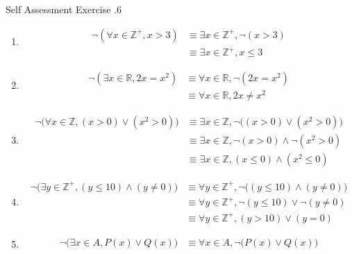 \documentclass[../notes.tex]{subfiles}
\begin{document}
			\begin{exercise}{Self Assessment Exercise \thechapter.6}
				\begin{enumerate}[label=(\alph*)]
					\item {}
						\begin{align*}
							\lnot (\forall x \in \mathbb{Z}^{+}, x > 3) &\equiv \exists x \in \mathbb{Z}^{+}, \lnot (x > 3)\\
							& \equiv \exists x \in \mathbb{Z}^{+}, x \leq 3
						\end{align*}
					\item {}
						\begin{align*}
							\lnot (\exists x \in \mathbb{R}, 2x = x^{2}) & \equiv \forall x \in \mathbb{R}, \lnot(2x = x^{2})\\
							& \equiv \forall x \in \mathbb{R}, 2x \neq x^{2}
						\end{align*}
					\item {}
						\begin{align*}
							\lnot \bigl(\forall x \in \mathbb{Z}, (x > 0) \lor (x^{2} > 0)\bigr) & \equiv \exists x \in \mathbb{Z}, \lnot \bigl((x > 0) \lor (x^{2} > 0)\bigr)\\
							& \equiv \exists x \in \mathbb{Z}, \lnot (x > 0) \land \lnot (x^{2} > 0)\\
							& \equiv \exists x \in \mathbb{Z}, (x \leq 0) \land (x^{2} \leq 0)
						\end{align*}
					\item {}
						\begin{align*}
							\lnot \bigl(\exists y \in \mathbb{Z}^{+}, (y \leq 10) \land (y \neq 0)\bigr) & \equiv \forall y \in \mathbb{Z}^{+}, \lnot \bigl((y \leq 10) \land (y \neq 0)\bigr)\\
							& \equiv \forall y \in \mathbb{Z}^{+}, \lnot (y \leq 10) \lor \lnot (y \neq 0)\\
							& \equiv \forall y \in \mathbb{Z}^{+}, (y > 10) \lor (y = 0)
						\end{align*}
					\item {}
						\begin{align*}
							\lnot \bigl(\exists x \in A, P(x) \lor Q(x)\bigr) & \equiv \forall x \in A, \lnot \bigl(P(x) \lor Q(x)\bigr)\\

\end{align*}
\end{enumerate}
\end{exercise}
\end{document}
